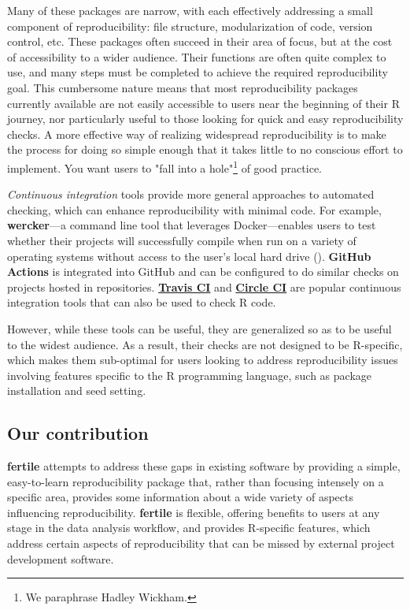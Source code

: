 \documentclass[APA,LATO1COL]{WileyNJD-v2}\usepackage[]{graphicx}\usepackage[]{color}
\newcommand{\R}{\textsf{R}\xspace}
\newcommand{\pkg}[1]{\textbf{#1}}
\begin{document}
Many of these packages are narrow, with each effectively addressing a small component of reproducibility: file structure, modularization of code, version control, etc. These packages often  succeed in their area of focus, but at the cost of accessibility to a wider audience. Their functions are often quite complex to use, and many steps must be completed to achieve the required reproducibility goal. This cumbersome nature means that most reproducibility packages currently available are not easily accessible to users near the beginning of their \R journey, nor particularly useful to those looking for quick and easy reproducibility checks.
A more effective way of realizing widespread reproducibility is to make the process for doing so simple enough that it takes little to no conscious effort to implement. You want users to "fall into a hole"\footnote{We paraphrase Hadley Wickham.} of good practice. 

\emph{Continuous integration} tools provide more general approaches to automated checking, which can enhance reproducibility with minimal code. For example, \pkg{wercker}---a command line tool that leverages Docker---enables users to test whether their projects will successfully compile when run on a variety of operating systems without access to the user's local hard drive (\cite{wercker}). \pkg{GitHub Actions} is integrated into GitHub and can be configured to do similar checks on projects hosted in repositories. \href{https://travis-ci.com}{\pkg{Travis CI}} and \href{https://circleci.com/product}{\pkg{Circle CI}} are popular continuous integration tools that can also be used to check \R code. 

However, while these tools can be useful, they are generalized so as to be useful to the widest audience. As a result, their checks are not designed to be \R-specific, which makes them sub-optimal for users looking to address reproducibility issues involving features specific to the \R programming language, such as package installation and seed setting.

\subsection{Our contribution}

\pkg{fertile} attempts to address these gaps in existing software by providing a simple, easy-to-learn reproducibility package that, rather than focusing intensely on a specific area, provides some information about a wide variety of aspects influencing reproducibility. \pkg{fertile} is flexible, offering benefits to users at any stage in the data analysis workflow, and provides \R-specific features, which address certain aspects of reproducibility that can be missed by external project development software.
\end{document}
